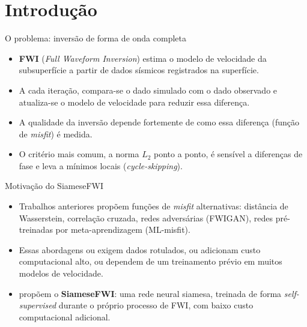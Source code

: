 \section{Introdução}

\begin{frame}{O problema: inversão de forma de onda completa}
	\begin{itemize}
		\item \textbf{FWI} (\textit{Full Waveform Inversion}) estima o modelo de velocidade da subsuperfície a partir de dados sísmicos registrados na superfície.
		\item A cada iteração, compara-se o dado simulado com o dado observado e atualiza-se o modelo de velocidade para reduzir essa diferença.
		\item A qualidade da inversão depende fortemente de como essa diferença (função de \textit{misfit}) é medida.
		\item O critério mais comum, a norma $L_2$ ponto a ponto, é sensível a diferenças de fase e leva a mínimos locais (\textit{cycle-skipping}).
	\end{itemize}
\end{frame}

\begin{frame}{Motivação do SiameseFWI}
	\begin{itemize}
		\item Trabalhos anteriores propõem funções de \textit{misfit} alternativas: distância de Wasserstein, correlação cruzada, redes adversárias (FWIGAN), redes pré-treinadas por meta-aprendizagem (ML-misfit).
		\item Essas abordagens ou exigem dados rotulados, ou adicionam custo computacional alto, ou dependem de um treinamento prévio em muitos modelos de velocidade.
		\item {} propõem o \textbf{SiameseFWI}: uma rede neural siamesa, treinada de forma \textit{self-supervised} durante o próprio processo de FWI, com baixo custo computacional adicional.
	\end{itemize}
\end{frame}
